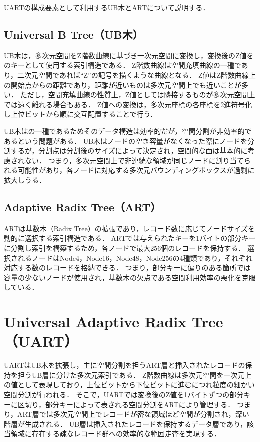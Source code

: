 UARTの構成要素として利用するUB木とARTについて説明する．

\section{Universal B Tree（UB木）}

UB木は，多次元空間をZ階数曲線に基づき一次元空間に変換し，変換後のZ値を\BTree{}のキーとして使用する索引構造である．
Z階数曲線は空間充填曲線の一種であり，二次元空間であれば``Z''の記号を描くような曲線となる．
Z値はZ階数曲線上の開始点からの距離であり，距離が近いものは多次元空間上でも近いことが多い．
ただし，空間充填曲線の性質上，Z値としては隣接するものが多次元空間上では遠く離れる場合もある．
Z値への変換は，多次元座標の各座標を2進符号化し上位ビットから順に交互配置することで行う．

UB木は\BTree{}の一種であるためそのデータ構造は効率的だが，空間分割が非効率的であるという問題がある．
UB木はノードの空き容量がなくなった際にノードを分割するが，分割点は分割後のサイズによって決定され，空間的な面は基本的に考慮されない．
つまり，多次元空間上で非連続な領域が同じノードに割り当てられる可能性があり，各ノードに対応する多次元バウンディングボックスが過剰に拡大しうる．

\section{Adaptive Radix Tree（ART）}

ARTは基数木（Radix Tree）の拡張であり，レコード数に応じてノードサイズを動的に選択する索引構造である．
ARTでは与えられたキーを1バイトの部分キーに分割し索引を構築するため，各ノードで最大256個のレコードを保持する．
選択されるノードはNode4，Node16，Node48，Node256の4種類であり，それぞれ対応する数のレコードを格納できる．
つまり，部分キーに偏りのある箇所では容量の少ないノードが使用され，基数木の欠点である空間利用効率の悪化を克服している．





\chapter{Universal Adaptive Radix Tree（UART）}

UARTはUB木を拡張し，主に空間分割を担うART層と挿入されたレコードの保持を担うUB層に分けた多次元索引である．
Z階数曲線は多次元空間を一次元上の値として表現しており，上位ビットから下位ビットに進むにつれ粒度の細かい空間分割が行われる．
そこで，UARTでは変換後のZ値を1バイトずつの部分キーに区切り，部分キーによって表される空間分割をARTにより管理する．
つまり，ART層では多次元空間上でレコードが密な領域ほど空間が分割され，深い階層が生成される．
UB層は挿入されたレコードを保持するデータ層であり，該当領域に存在する疎なレコード群への効率的な範囲走査を実現する．

